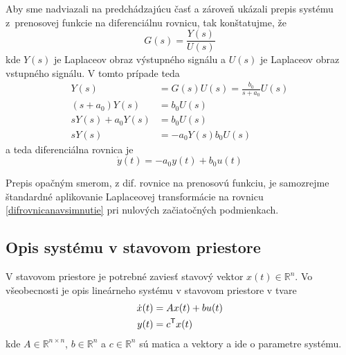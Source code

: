 \documentclass[a4paper, 10pt, ]{article}
\begin{document}
Aby sme nadviazali na predchádzajúcu časť a zároveň ukázali prepis systému z~prenosovej funkcie na diferenciálnu rovnicu, tak konštatujme, že
\begin{equation}
    G(s) = \frac{Y(s)}{U(s)}
\end{equation}
kde $Y(s)$ je Laplaceov obraz výstupného signálu a $U(s)$ je Laplaceov obraz vstupného signálu. V tomto prípade teda
\begin{subequations}
\begin{align}
    Y(s) &= G(s) U(s) = \frac{b_0}{s + a_0} U(s) \\
    \left(s + a_0\right) Y(s) &= b_0 U(s) \\
    s Y(s) + a_0 Y(s) &= b_0 U(s) \\
    s Y(s)  &= -  a_0 Y(s) b_0 U(s) 
\end{align}
\end{subequations}
a teda diferenciálna rovnica je
\begin{equation} \label{difrovnicanavsimnutie}
    \dot y(t) = - a_0 y(t) + b_0 u(t)
\end{equation}

Prepis opačným smerom, z dif. rovnice na prenosovú funkciu, je samozrejme štandardné aplikovanie Laplaceovej transformácie na rovnicu \eqref{difrovnicanavsimnutie} pri nulových začiatočných podmienkach. 



\subsection{Opis systému v stavovom priestore}

V stavovom priestore je potrebné zaviesť stavový vektor $x(t) \in \mathbb R^n$. Vo všeobecnosti je opis lineárneho systému v stavovom priestore v tvare
\begin{subequations}
\begin{align}
    \dot x(t) &= A x(t) + b u(t) \\
    y(t) &= c^{\mathsf{T}} x(t) 
\end{align}
\end{subequations}
kde $A \in \mathbb R^{n \times n}$, $b \in \mathbb R^n$ a $c \in \mathbb R^n$ sú matica a vektory a ide o parametre systému. 
\end{document}
